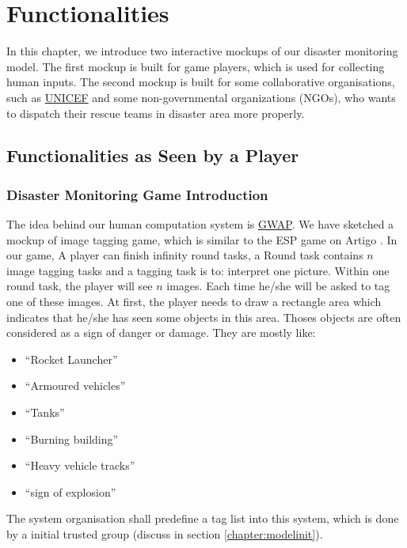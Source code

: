 \section{Functionalities}
\label{chapter:func}

In this chapter,
we introduce two interactive mockups of our disaster monitoring model.
The first mockup is built for game players,
which is used for collecting human inputs.
The second mockup is built for some collaborative organisations,
such as \hyperref[idx:unicef]{UNICEF} and some non-governmental organizations (NGOs),
who wants to dispatch their rescue teams in disaster area more properly. 

\subsection{Functionalities as Seen by a Player}

\subsubsection{Disaster Monitoring Game Introduction}
The idea behind our human computation system is \hyperref[idx:gwap]{GWAP}.
We have sketched a mockup of image tagging game,
which is similar to the ESP game on Artigo \cite{wieser2013artigo}.
In our game,
A player can finish infinity round tasks, 
a Round task contains $n$ image tagging tasks and a tagging task is to: interpret one picture.
Within one round task, the player will see $n$ images.
Each time he/she will be asked to tag one of these images.
At first,
the player needs to draw a rectangle area which indicates that he/she has seen some objects in this area.
Thoses objects are often considered as a sign of danger or damage.
They are mostly like:

\begin{itemize}
  \item ``Rocket Launcher''
  \item ``Armoured vehicles''
  \item ``Tanks''
  \item ``Burning building''
  \item ``Heavy vehicle tracks''
  \item ``sign of explosion''
\end{itemize}

The system organisation shall predefine a tag list into this system, 
which is done by a initial trusted group (discuss in section \ref{chapter:modelinit}).

